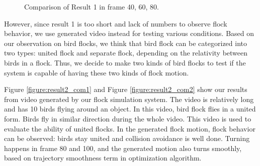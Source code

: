 \begin{figure}[h]
\begin{center}
\hspace{\fill}
\hspace{\fill}


\hspace{\fill}
\hspace{\fill}


\hspace{\fill}
\hspace{\fill}
\end{center}
\caption{Comparison of Result 1 in frame 40, 60, 80.}
\label{figure:result1_com}
\end{figure}


However, since result 1 is too short and lack of numbers to observe flock behavior, we use generated video instead for testing various conditions. Based on our observation on bird flocks, we think that bird flock can be categorized into two types: united flock and separate flock, depending on the relativity between birds in a flock. Thus, we decide to make two kinds of bird flocks to test if the system is capable of having these two kinds of flock motion.


Figure \ref{figure:result2_com1} and Figure \ref{figure:result2_com2} show our results from video generated by our flock simulation system. The video is relatively long and has 10 birds flying around an object. In this video, bird flock flies in a united form. Birds fly in similar direction during the whole video. This video is used to evaluate the ability of united flocks. In the generated flock motion, flock behavior can be observed: birds stay united and collision avoidance is well done. Turning happens in frame 80 and 100, and the generated motion also turns smoothly, based on trajectory smoothness term in optimization algorithm.


